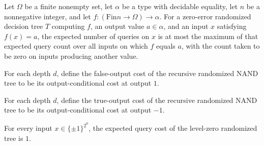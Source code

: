 \begin{theorem}
\label{FABL.RandomizedDecisionTree.inputCost_le_outputConditionalCost}
\leanok
{}
Let $\Omega$ be a finite nonempty set, let $\alpha$ be a type with decidable equality,
let $n$ be a nonnegative integer, and let $f:(\mathrm{Fin} n\to\Omega)\to\alpha$. For a
zero-error randomized decision tree $T$ computing $f$, an output value $a\in\alpha$, and
an input $x$ satisfying $f(x)=a$, the expected number of queries on $x$ is at most the
maximum of that expected query count over all inputs on which $f$ equals $a$, with the
count taken to be zero on inputs producing another value.
\end{theorem}

\begin{definition}
\label{FABL.recursiveNandFalseOutputCost}
\leanok
{}
For each depth $d$, define the false-output cost of the recursive randomized NAND tree
to be its output-conditional cost at output $1$.
\end{definition}

\begin{definition}
\label{FABL.recursiveNandTrueOutputCost}
\leanok
{}
For each depth $d$, define the true-output cost of the recursive randomized NAND tree to
be its output-conditional cost at output $-1$.
\end{definition}

\begin{theorem}
\label{FABL.recursiveNandRandomizedTree_inputCost_zero}
\leanok
{}
For every input $x\in\{\pm1\}^{2^0}$, the expected query cost of the level-zero
randomized tree is $1$.
\end{theorem}

